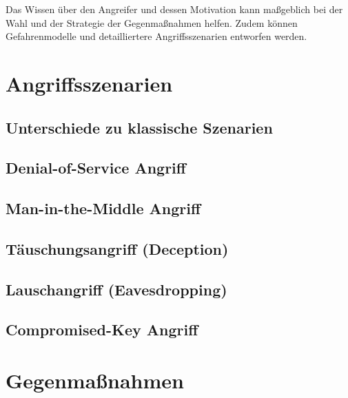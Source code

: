 \documentclass[final,bibliography=totocnumbered]{include/sikseminar}
\begin{document}
Das Wissen über den Angreifer und dessen Motivation kann maßgeblich bei der Wahl und der Strategie der Gegenmaßnahmen helfen.
Zudem können Gefahrenmodelle und detailliertere Angriffsszenarien entworfen werden.


\section{Angriffsszenarien}\label{sec:angriffszenarien}
\subsection{Unterschiede zu klassische Szenarien}\label{subsec:klassisch}
\subsection{Denial-of-Service Angriff}\label{subsec:dos}
\subsection{Man-in-the-Middle Angriff}\label{subsec:mitm}
\subsection{T\"auschungsangriff (Deception)}\label{subsec:tauschung} %
\subsection{Lauschangriff (Eavesdropping)}\label{subsec:lauschen} %
\subsection{Compromised-Key Angriff}\label{subsec:key}


\section{Gegenmaßnahmen}\label{sec:gegenmassnahmen}
\end{document}
